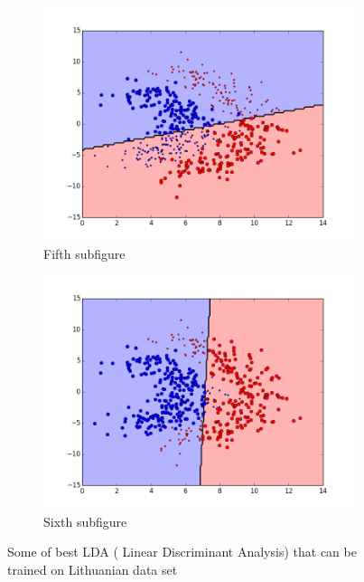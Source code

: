 \begin{figure}[t!]
\medskip
\begin{subfigure}{0.48\textwidth}
\includegraphics[width=\linewidth]{figs/Lithuanian/118All-Classifiers}
\caption{Fifth subfigure} \label{fig:Lithuanian_all_single_e}
\end{subfigure}\hspace*{\fill}
\begin{subfigure}{0.48\textwidth}
\includegraphics[width=\linewidth]{figs/Lithuanian/146All-Classifiers}
\caption{Sixth subfigure} \label{fig:Lithuanian_all_single_f}
\end{subfigure}

\caption{Some of best LDA ( Linear Discriminant Analysis) that can be trained on Lithuanian data set} \label{fig:Lithuanian_all_single}
\end{figure}

